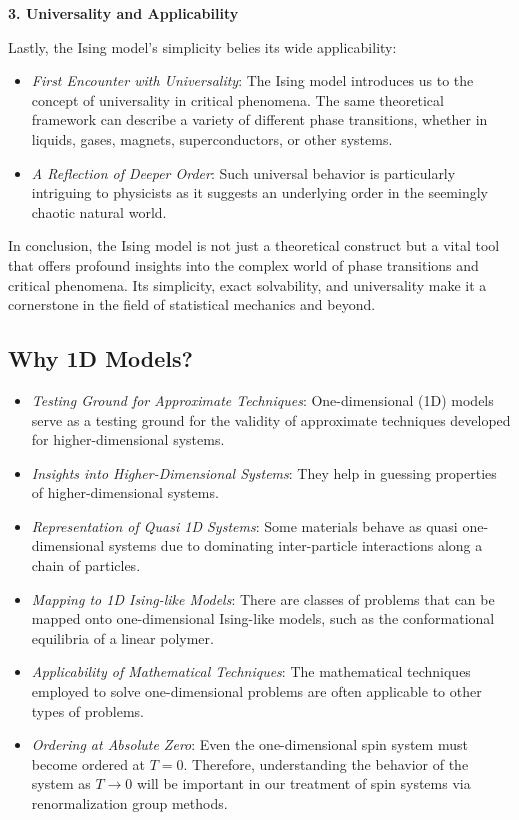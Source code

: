 \textbf{3. Universality and Applicability}

Lastly, the Ising model's simplicity belies its wide applicability:

\begin{itemize}
  \item \textit{First Encounter with Universality}: The Ising model introduces
  us to the concept of universality in critical phenomena. The same theoretical
  framework can describe a variety of different phase transitions, whether in
  liquids, gases, magnets, superconductors, or other systems.
  \item \textit{A Reflection of Deeper Order}: Such universal behavior is
  particularly intriguing to physicists as it suggests an underlying order in
  the seemingly chaotic natural world.
\end{itemize}

In conclusion, the Ising model is not just a theoretical construct but a vital
tool that offers profound insights into the complex world of phase transitions
and critical phenomena. Its simplicity, exact solvability, and universality make
it a cornerstone in the field of statistical mechanics and beyond.


\subsection{Why 1D Models?}
\begin{itemize}
  \item \textit{Testing Ground for Approximate Techniques}: One-dimensional (1D)
  models serve as a testing ground for the validity of approximate techniques
  developed for higher-dimensional systems.
  \item \textit{Insights into Higher-Dimensional Systems}: They help in guessing
  properties of higher-dimensional systems.
  \item \textit{Representation of Quasi 1D Systems}: Some materials behave as
  quasi one-dimensional systems \cite{Fava2020} \cite{Muller1993} due to
  dominating inter-particle interactions along a chain of particles.
  \item \textit{Mapping to 1D Ising-like Models}: There are classes of problems
  that can be mapped onto one-dimensional Ising-like models, such as the
  conformational equilibria of a linear polymer. \cite{Applequist1968}
  \item \textit{Applicability of Mathematical Techniques}: The mathematical
  techniques employed to solve one-dimensional problems are often applicable to
  other types of problems.
  \item \textit{Ordering at Absolute Zero}: Even the one-dimensional spin system
  must become ordered at \( T = 0 \). Therefore, understanding the behavior of
  the system as \( T \rightarrow 0 \) will be important in our treatment of spin
  systems via renormalization group methods.
\end{itemize}